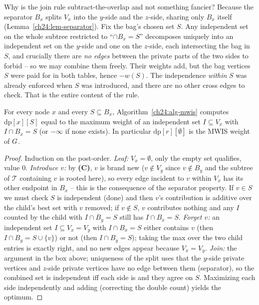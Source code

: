 \begin{whybox}
Why is the join rule subtract-the-overlap and not something fancier? Because the
separator $B_x$ splits $V_x$ into the $y$-side and the $z$-side, sharing only
$B_x$ itself (Lemma~\ref{ch24:lem-separator}). Fix the bag's chosen set $S$. Any
independent set on the whole subtree restricted to ``$\cap B_x=S$'' decomposes
uniquely into an independent set on the $y$-side and one on the $z$-side, each
intersecting the bag in $S$, and crucially there are \emph{no edges} between the
private parts of the two sides to forbid -- so we may combine them freely. Their
weights add, but the bag vertices $S$ were paid for in both tables, hence
$-w(S)$. The independence \emph{within} $S$ was already enforced when $S$ was
introduced, and there are no other cross edges to check. That is the entire
content of the rule.
\end{whybox}

\begin{theorem}
\label{ch24:thm-mwis}
For every node $x$ and every $S\subseteq B_x$, Algorithm~\ref{ch24:alg-mwis}
computes $\mathrm{dp}[x][S]$ equal to the maximum weight of an independent set
$I\subseteq V_x$ with $I\cap B_x=S$ (or $-\infty$ if none exists). In particular
$\mathrm{dp}[r][\emptyset]$ is the MWIS weight of $G$.
\end{theorem}

\begin{proof}
Induction on the post-order. \emph{Leaf:} $V_x=\emptyset$, only the empty set
qualifies, value $0$. \emph{Introduce $v$:} by \textbf{(C)}, $v$ is brand new
($v\notin V_y$ since $v\notin B_y$ and the subtree of $\mathcal{T}$ containing $v$
is rooted here), so every edge incident to $v$ within $V_x$ has its other endpoint
in $B_x$ -- this is the consequence of the separator property. If $v\in S$ we must
check $S$ is independent (done) and then $v$'s contribution is additive over the
child's best set with $v$ removed; if $v\notin S$, $v$ contributes nothing and any
$I$ counted by the child with $I\cap B_y=S$ still has $I\cap B_x=S$.
\emph{Forget $v$:} an independent set $I\subseteq V_x=V_y$ with $I\cap B_x=S$
either contains $v$ (then $I\cap B_y=S\cup\{v\}$) or not (then $I\cap B_y=S$);
taking the max over the two child entries is exactly right, and no new edges
appear because $V_x=V_y$. \emph{Join:} the argument in the box above; uniqueness
of the split uses that the $y$-side private vertices and $z$-side private vertices
have no edge between them (separator), so the combined set is independent iff each
side is and they agree on $S$. Maximizing each side independently and adding
(correcting the double count) yields the optimum.
\end{proof}

